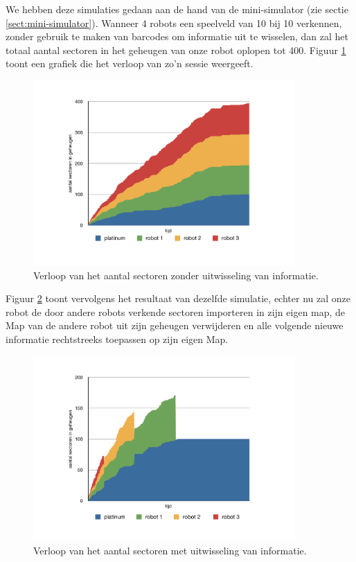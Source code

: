 \documentclass[12pt,a4paper]{report}
\begin{document}
We hebben deze simulaties gedaan aan de hand van de mini-simulator (zie sectie \ref{sect:mini-simulator}). Wanneer 4 robots een speelveld van 10 bij 10 verkennen, zonder gebruik te maken van barcodes om informatie uit te wisselen, dan zal het totaal aantal sectoren in het geheugen van onze robot oplopen tot 400. Figuur \ref{chart:sectors-no-merge} toont een grafiek die het verloop van zo'n sessie weergeeft.

\begin{figure}[htbp]
  \centering
  \includegraphics[width=100mm]{resources/sectors-no-merge.pdf}
  \caption{Verloop van het aantal sectoren zonder uitwisseling van informatie.}
  \label{chart:sectors-no-merge}
\end{figure}

Figuur \ref{chart:sectors-with-merge} toont vervolgens het resultaat van dezelfde simulatie, echter nu zal onze robot de door andere robots verkende sectoren importeren in zijn eigen map, de Map van de andere robot uit zijn geheugen verwijderen en alle volgende nieuwe informatie rechtstreeks toepassen op zijn eigen Map.

\begin{figure}[htbp]
  \centering
  \includegraphics[width=100mm]{resources/sectors-with-merge.pdf}
  \caption{Verloop van het aantal sectoren met uitwisseling van informatie.}
  \label{chart:sectors-with-merge}
\end{figure}
\end{document}
